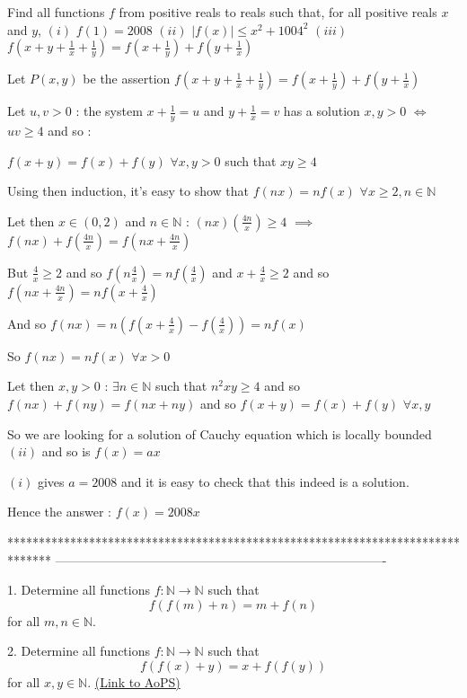 \begin{solution}
	\begin{tcolorbox}Find all functions $f$ from positive reals to reals such that, for all positive reals $x$ and $y$, 
$(i)$ $f(1)=2008$
$(ii)$ $|f(x)| \leq x^2+1004^2$
$(iii)$ $f(x+y+\frac{1}{x}+\frac{1}{y})=f(x+\frac{1}{y})+f(y+\frac{1}{x})$\end{tcolorbox}
Let $P(x,y)$ be the assertion $f(x+y+\frac 1x+\frac 1y)=f(x+\frac 1y)+f(y+\frac 1x)$

Let $u,v>0$ : the system $x+\frac 1y=u$ and $y+\frac 1x=v$ has a solution $x,y>0$ $\iff$ $uv\ge 4$ and so :

$f(x+y)=f(x)+f(y)$ $\forall x,y>0$ such that $xy\ge 4$

Using then induction, it's easy to show that $f(nx)=nf(x)$ $\forall x\ge 2,n\in\mathbb N$

Let then $x\in(0,2)$ and $n\in\mathbb N$ : $(nx)(\frac{4n}x)\ge 4$ $\implies$ $f(nx)+f(\frac{4n}x)=f(nx+\frac {4n}x)$

But $\frac 4x\ge 2$ and so $f(n\frac 4x)=nf(\frac 4x)$ and $x+\frac 4x\ge 2$ and so $f(nx+\frac {4n}x)=nf(x+\frac {4}x)$

And so $f(nx)=n(f(x+\frac {4}x)-f(\frac 4x))=nf(x)$

So $f(nx)=nf(x)$ $\forall x>0$

Let then $x,y>0$ : $\exists n\in\mathbb N$ such that $n^2xy\ge 4$ and so $f(nx)+f(ny)=f(nx+ny)$ and so $f(x+y)=f(x)+f(y)$ $\forall x,y$

So we are looking for a solution of Cauchy equation which is locally bounded $(ii)$ and so is $f(x)=ax$

$(i)$ gives $a=2008$ and it is easy to check that this indeed is a solution.

Hence the answer : $\boxed{f(x)=2008x}$
\end{solution}
*******************************************************************************
-------------------------------------------------------------------------------

\begin{problem}
	1. Determine all functions $f: \mathbb N \to \mathbb N$ such that
\[f(f(m)+n)=m+f(n)\]
for all $m,n\in\mathbb{N}$.

2. Determine all functions $f: \mathbb N \to \mathbb N$ such that
\[f(f(x)+y)=x+f(f(y))\]
for all $x,y\in\mathbb{N}$.
	\flushright \href{https://artofproblemsolving.com/community/c6h441662}{(Link to AoPS)}
\end{problem}



